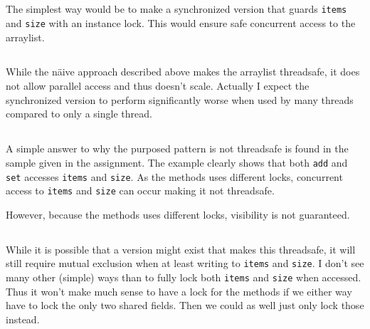 \documentclass{ituhandin}
\begin{document}
\chapter{} %
\section{}
The simplest way would be to make a synchronized version that guards \texttt{items} and \texttt{size} with an instance lock. This would ensure safe concurrent access to the arraylist.
\section{}\label{sec:lock}
While the näive approach described above makes the arraylist threadsafe, it does not allow parallel access and thus doesn't scale. Actually I expect the synchronized version to perform significantly worse when used by many threads compared to only a single thread.
\section{}
A simple answer to why the purposed pattern is not threadsafe is found in the sample given in the assignment. The example clearly shows that both \texttt{add} and \texttt{set} accesses \texttt{items} and \texttt{size}. As the methods uses different locks, concurrent access to \texttt{items} and \texttt{size} can occur making it not threadsafe.


However, because the methods uses different locks, visibility is not guaranteed.
\section{}
While it is possible that a version might exist that makes this threadsafe, it will still require mutual exclusion when at least writing to \texttt{items} and \texttt{size}. I don't see many other (simple) ways than to fully lock both \texttt{items} and \texttt{size} when accessed. Thus it won't make much sense to have a lock for the methods if we either way have to lock the only two shared fields. Then we could as well just only lock those instead.
\end{document}
